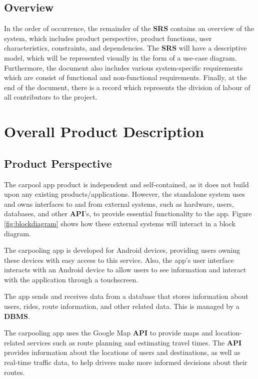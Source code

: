 \documentclass[]{article}
\begin{document}
\subsection{Overview}
\label{sub:overview}
In the order of occurrence, the remainder of the \textbf{SRS} contains an overview of the system, which includes product perspective, product functions, user characteristics, constraints, and dependencies. The \textbf{SRS} will have a descriptive model, which will be represented visually in the form of a use-case diagram. Furthermore, the document also includes various system-specific requirements which are consist of functional and non-functional requirements.  Finally, at the end of the document, there is a record which represents the division of labour of all contributors to the project.


\section{Overall Product Description}
\label{sec:overall_description}

\subsection{Product Perspective}
\label{sub:product_perspective}
The carpool app product is independent and self-contained, as it does not build upon any existing products/applications. However, the standalone system uses and owns interfaces to and from external systems, such as hardware, users, databases, and other \textbf{API}'s, to provide essential functionality to the app. Figure \ref{fig:blockdiagram} shows how these external systems will interact in a block diagram.

The carpooling app is developed for Android devices, providing users owning these devices with easy access to this service. Also, the app's user interface interacts with an Android device to allow users to see information and interact with the application through a touchscreen.

The app sends and receives data from a database that stores information about users, rides, route information, and other related data. This is managed by a \textbf{DBMS}.

The carpooling app uses the Google Map \textbf{API} to provide maps and location-related services such as route planning and estimating travel times. The \textbf{API} provides information about the locations of users and destinations, as well as real-time traffic data, to help drivers make more informed decisions about their routes.
\end{document}
